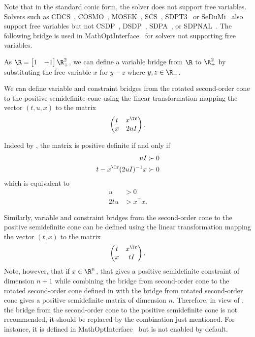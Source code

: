 \documentclass[11pt,twoside,a4paper,openright]{uclouvain-thesis}
\begin{document}
Note that in the standard conic form, the solver does not support free variables.
Solvers such as CDCS~\cite{zheng2020chordal}, COSMO~\cite{garstka_2019}, MOSEK~\cite{mosek2017mosek81082}, SCS~\cite{ocpb:16}, SDPT3~\cite{tutuncu2003solving} or SeDuMi~\cite{sturm1999using} %
also support free variables but not CSDP~\cite{borchers1999csdp}, DSDP~\cite{dsdp1}, SDPA~\cite{yamashita2003implementation}, or SDPNAL~\cite{yang2015sdpnal}.
The following bridge is used in MathOptInterface~\cite{legat2021mathoptinterface} for solvers not supporting free variables.
\begin{myexem}
  As $\R =
  \begin{bmatrix}
    1 & -1
  \end{bmatrix} \R_+^2$,
  we can define a variable bridge from $\R$ to $\R_+^2$ by substituting
  the free variable $x$ for $y - z$ where $y, z \in \R_+$.
\end{myexem}

\begin{myexem}
  \label{exem:rsoc_to_psd}
  We can define variable and constraint bridges from the rotated second-order cone to the positive semidefinite cone using the linear transformation mapping the vector $(t, u, x)$
  to the matrix
  \[
    \begin{pmatrix}
      t & x^\Tr\\
      x & 2uI
    \end{pmatrix}.
  \]

  Indeed by , the matrix is positive definite if and only if
  \begin{align*}
    uI & \succ 0\\
    t - x^\Tr (2uI)^{-1} x & \succ 0
  \end{align*}
  which is equivalent to
  \begin{align*}
    u & > 0\\
    2tu & > x^\top x.
  \end{align*}

  Similarly, variable and constraint bridges from the second-order cone to the positive
  semidefinite cone can be defined using the linear
  transformation mapping the vector $(t, x)$ to the matrix
  \[
    \begin{pmatrix}
      t & x^\Tr\\
      x & tI
    \end{pmatrix}.
  \]
  Note, however, that if $x \in \R^n$, that gives a positive semidefinite
  constraint of dimension $n + 1$ while combining the bridge from second-order cone to the rotated second-order cone defined in 
  with the bridge from rotated second-order cone gives a positive semidefinite matrix of dimension $n$.
  Therefore, in view of , the bridge from the second-order cone to
  the positive semidefinite cone is not recommended, it should be replaced by the combination just mentioned.
  For instance, it is defined in MathOptInterface~\cite{legat2021mathoptinterface} but is not enabled by default.
\end{myexem}
\end{document}
